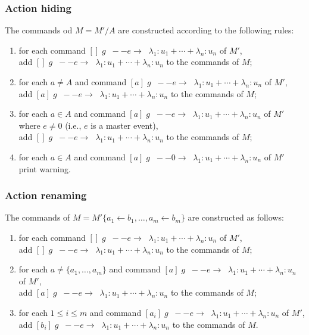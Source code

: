 \documentclass{article}
\newcommand{\arc}[1]{\;\;--{#1}\longrightarrow \;\;}
\renewcommand{\_}{\underline{~}}
\begin{document}
\subsubsection*{Action hiding}

The commands od $M = M'/A$ are constructed according to the following rules:

\begin{enumerate}

	\item for each command $[] \; g \arc{e}   \lambda_1 : u_1 + \cdots + \lambda_n : u_n$ of $M'$, \\ 
	add	$[] \; g \arc{e}   \lambda_1 : u_1 + \cdots + \lambda_n : u_n$ to the commands of $M$;

	\item for each $a \neq A$ and command $[a] \; g \arc{e}   \lambda_1 : u_1 + \cdots + \lambda_n : u_n$ of $M'$, \\ 
	add	$[a] \; g \arc{e}   \lambda_1 : u_1 + \cdots + \lambda_n : u_n$ to the commands of $M$;

	\item for each $a \in A$ and command $[a] \; g \arc{e} \lambda_1 : u_1 + \cdots + \lambda_n : u_n$ of $M'$ where $e \neq 0$ (i.e., $e$ is a master event), \\
	add $[] \; g \arc{e} \lambda_1 : u_1 + \cdots + \lambda_n : u_n$ to the commands of $M$;
	\item for each $a \in A$ and command $[a] \; g \arc{0} \lambda_1 : u_1 + \cdots + \lambda_n : u_n$ of $M'$ print warning.
\end{enumerate}

\subsubsection*{Action renaming}

The commands of $M= M'\{a_1 \leftarrow b_1, \ldots, a_m \leftarrow b_m \}$ are constructed as follows:

\begin{enumerate}
	
	\item for each command $[] \; g \arc{e}   \lambda_1 : u_1 + \cdots + \lambda_n : u_n$ of $M'$, \\ 
	add	$[] \; g \arc{e}   \lambda_1 : u_1 + \cdots + \lambda_n : u_n$ to the commands of $M$;
	
	\item for each $a \neq \{a_1,\ldots,a_m\}$ and command $[a] \; g \arc{e}   \lambda_1 : u_1 + \cdots + \lambda_n : u_n$ of $M'$, \\ 
	add	$[a] \; g \arc{e}   \lambda_1 : u_1 + \cdots + \lambda_n : u_n$ to the commands of $M$;
	
	\item for each $1 \leq i \leq m$ and command $[a_i] \; g \arc{e} \lambda_1 : u_1 + \cdots + \lambda_n : u_n$ of $M'$, \\
	add $[b_i] \; g \arc{e} \lambda_1 : u_1 + \cdots + \lambda_n : u_n$ to the commands of $M$.
\end{enumerate}
\end{document}
